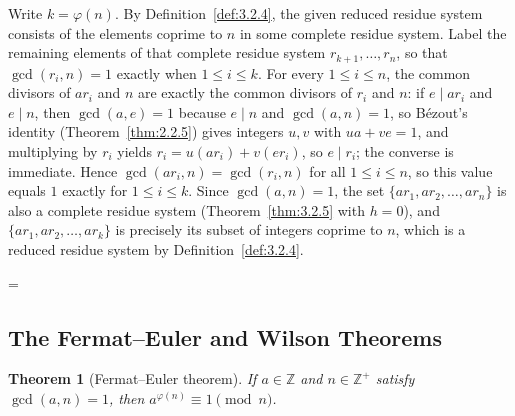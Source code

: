 \documentclass[11pt]{article}
\makeatletter
\theoremstyle{ntstyle}
\newtheorem{theorem}{Theorem}[subsection]
\let\nt@closedisplay\]
\def\nt@guardedclose{\@ifnextchar\par{\nt@closeafterpar}{\@ifnextchar\end{\postdisplaypenalty\@M\nt@closedisplay}{\nt@closedisplay}}}
\def\nt@closeafterpar\par{\@ifnextchar\par{\nt@closeafterpar}{\@ifnextchar\end{\postdisplaypenalty\@M\nt@closedisplay\par}{\nt@closedisplay\par}}}
\renewenvironment{proof}[1][\proofname]{\par
  \pushQED{\qed}\normalfont\topsep\medskipamount\edef\nt@afterproof{\@endparpenalty=\the\@endparpenalty\relax}\@beginparpenalty\@M\@endparpenalty\@M\let\]\nt@guardedclose\trivlist\item[]\textit{#1\@addpunct{.}} \ignorespaces}{\ifvmode\addpenalty\@M\fi\popQED\nt@afterproof\endtrivlist\@endpefalse}
\makeatother
\begin{document}
\begin{proof} Write $k=\varphi(n)$. By Definition~\ref{def:3.2.4}, the
	given reduced residue system consists of the elements coprime to $n$
	in some complete residue system. Label the remaining elements of that complete residue system
	$r_{k+1},\ldots,r_n$, so that $\gcd(r_i,n)=1$ exactly when $1\le i\le k$. For every $1 \le i \le n$, the common
	divisors of $ar_i$ and $n$ are exactly the common divisors of $r_i$
	and $n$: if $e\mid ar_i$ and $e\mid n$, then $\gcd(a, e)=1$ because
	$e\mid n$ and $\gcd(a, n)=1$, so B{\'e}zout's identity (Theorem~\ref{thm:2.2.5})
	gives integers $u,v$ with
	$ua+ve=1$, and multiplying by $r_i$ yields $r_i=u(ar_i)+v(er_i)$, so
	$e\mid r_i$; the converse is immediate. Hence $\gcd(ar_i, n) =
		\gcd(r_i, n)$ for all $1 \le i \le n$, so this value equals $1$
	exactly for $1 \le i \le k$. Since $\gcd(a, n)=1$, the set $\{a
		r_1, a r_2, \ldots, a r_n\}$ is also a complete residue system
	(Theorem~\ref{thm:3.2.5} with $h = 0$), and $\{a r_1, a r_2, \ldots, a r_k\}$ is
	precisely
	its subset of integers coprime to $n$, which is a reduced residue
	system by Definition~\ref{def:3.2.4}.

\end{proof}
\subsection{The Fermat--Euler and Wilson Theorems}

\begin{theorem}[Fermat--Euler theorem]\label{thm:3.3.1} If $a \in \mathbb{Z}$
	and $n \in \mathbb{Z}^+$ satisfy $\gcd(a, n)=1$, then $a^{\varphi(n)} \equiv
		1 \pmod{n}$.

\end{theorem}
\end{document}
